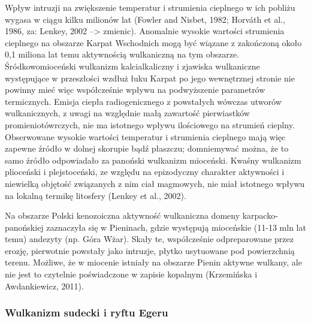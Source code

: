 \documentclass[11.5pt,twoside]{report}
\begin{document}
Wpływ intruzji na zwiększenie temperatur i strumienia cieplnego w ich pobliżu wygasa w ciągu kilku milionów lat (Fowler and Nisbet, 1982; Horv\'{a}th et al., 1986, za: Lenkey, 2002 --> zmienic). Anomalnie wysokie wartości strumienia cieplnego na obszarze Karpat Wschodnich mogą być wiązane z zakończoną około 0,1 miliona lat temu aktywnością wulkaniczną na tym obszarze. Śródkowomioceński wulkanizm kalcialkaliczny i zjawiska wulkaniczne występujące w przeszłości wzdłuż łuku Karpat po jego wewnętrznej stronie nie powinny mieć więc współcześnie wpływu na podwyższenie parametrów termicznych. Emisja ciepła radiogenicznego z powstałych wówczas utworów wulkanicznych, z uwagi na względnie małą zawartość pierwiastków promieniotówrczych, nie ma istotnego wpływu ilościowego na strumień cieplny. Obserwowane wysokie wartości temperatur i strumienia cieplnego mają więc zapewne \'{z}ródło w dolnej skorupie bąd\'{z} płaszczu; domniemywać można, że to samo \'{z}ródło odpowiadało za panoński wulkanizm mioceński. Kwaśny wulkanizm plioceński i plejstoceński, ze względu na epizodyczny charakter aktywności i niewielką objętość związanych z nim ciał magmowych, nie miał istotnego wpływu na lokalną termikę litosfery (Lenkey et al., 2002).

Na obszarze Polski kenozoiczna aktywność wulkaniczna domeny karpacko-panońskiej zaznaczyła się w Pieninach, gdzie występują mioceńskie (11-13 mln lat temu) andezyty (np. Góra Wżar). Skały te, współcześnie odpreparowane przez erozję, pierwotnie powstały jako intruzje, płytko usytuowane pod powierzchnią terenu. Możliwe, że w miocenie istniały na obszarze Pienin aktywne wulkany, ale nie jest to czytelnie poświadczone w zapisie kopalnym (Krzemińska i Awdankiewicz, 2011).

	\subsubsection{Wulkanizm sudecki i ryftu Egeru}
\end{document}
